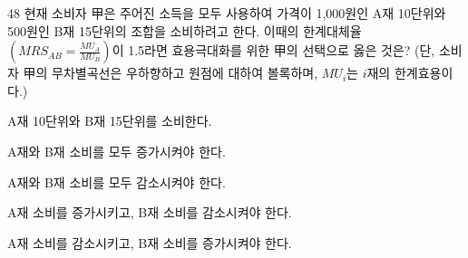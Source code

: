 \begin{question}{48}
현재 소비자 甲은 주어진 소득을 모두 사용하여 가격이 1,000원인 A재 10단위와 500원인 B재 15단위의 조합을 소비하려고 한다. 이때의 한계대체율$(MRS_{ AB } = \frac{ M U_{ A } } { M U_{ B } } )$이 1.5라면 효용극대화를 위한 甲의 선택으로 옳은 것은? (단, 소비자 甲의 무차별곡선은 우하향하고 원점에 대하여 볼록하며, $M U_{ i }$는 $i$재의 한계효용이다.)
\begin{choices}
  \item A재 10단위와 B재 15단위를 소비한다.
  \item A재와 B재 소비를 모두 증가시켜야 한다.
  \item A재와 B재 소비를 모두 감소시켜야 한다.
  \item A재 소비를 증가시키고, B재 소비를 감소시켜야 한다.
  \item A재 소비를 감소시키고, B재 소비를 증가시켜야 한다.
\end{choices}
\end{question}
